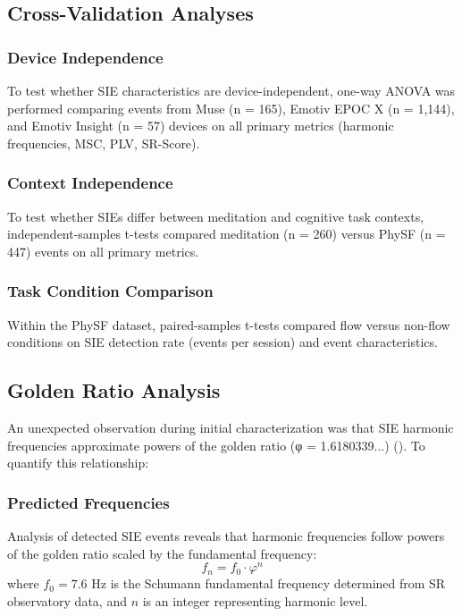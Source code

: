 \documentclass[11pt,a4paper]{article}
\begin{document}
\subsection{Cross-Validation Analyses}

\subsubsection{Device Independence}
To test whether SIE characteristics are device-independent, one-way ANOVA was performed comparing events from Muse (n = 165), Emotiv EPOC X (n = 1,144), and Emotiv Insight (n = 57) devices on all primary metrics (harmonic frequencies, MSC, PLV, SR-Score).

\subsubsection{Context Independence}
To test whether SIEs differ between meditation and cognitive task contexts, independent-samples t-tests compared meditation (n = 260) versus PhySF (n = 447) events on all primary metrics.

\subsubsection{Task Condition Comparison}
Within the PhySF dataset, paired-samples t-tests compared flow versus non-flow conditions on SIE detection rate (events per session) and event characteristics.

\subsection{Golden Ratio Analysis}
An unexpected observation during initial characterization was that SIE harmonic frequencies approximate powers of the golden ratio (φ = 1.6180339...) (\cite{livio2002golden}). To quantify this relationship:

\subsubsection{Predicted Frequencies}
Analysis of detected SIE events reveals that harmonic frequencies follow powers of the golden ratio scaled by the fundamental frequency:
\begin{equation}
    f_n = f_0 \cdot \varphi^n
\end{equation}
where $f_0 = 7.6$ Hz is the Schumann fundamental frequency determined from SR observatory data, and $n$ is an integer representing harmonic level.
\end{document}

